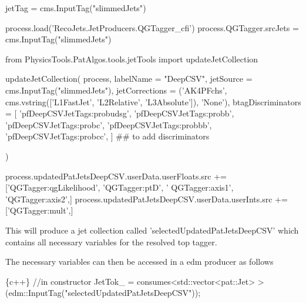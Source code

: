 \begin{DoxyCode}
jetTag = cms.InputTag(\textcolor{stringliteral}{"slimmedJets"})

process.load(\textcolor{stringliteral}{'RecoJets.JetProducers.QGTagger\_cfi'})
process.QGTagger.srcJets   = cms.InputTag(\textcolor{stringliteral}{"slimmedJets"})

from PhysicsTools.PatAlgos.tools.jetTools \textcolor{keyword}{import} updateJetCollection

updateJetCollection(
   process,
   labelName = \textcolor{stringliteral}{"DeepCSV"},
   jetSource = cms.InputTag(\textcolor{stringliteral}{"slimmedJets"}),
   jetCorrections = (\textcolor{stringliteral}{'AK4PFchs'}, cms.vstring([\textcolor{stringliteral}{'L1FastJet'}, \textcolor{stringliteral}{'L2Relative'}, \textcolor{stringliteral}{'L3Absolute'}]), \textcolor{stringliteral}{'None'}),
   btagDiscriminators = [
      \textcolor{stringliteral}{'pfDeepCSVJetTags:probudsg'},
      \textcolor{stringliteral}{'pfDeepCSVJetTags:probb'},
      \textcolor{stringliteral}{'pfDeepCSVJetTags:probc'},
      \textcolor{stringliteral}{'pfDeepCSVJetTags:probbb'},
      \textcolor{stringliteral}{'pfDeepCSVJetTags:probcc'},
      ] ## to add discriminators                                                                           
                                                                                                                  
                             
)

process.updatedPatJetsDeepCSV.userData.userFloats.src += [\textcolor{stringliteral}{'QGTagger:qgLikelihood'}, \textcolor{stringliteral}{'QGTagger:ptD'}, \textcolor{stringliteral}{'
      QGTagger:axis1'}, \textcolor{stringliteral}{'QGTagger:axis2'},]
process.updatedPatJetsDeepCSV.userData.userInts.src += [\textcolor{stringliteral}{'QGTagger:mult'},]
\end{DoxyCode}


This will produce a jet collection called 'selected\-Updated\-Pat\-Jets\-Deep\-C\-S\-V' which contains all necessary variables for the resolved top tagger.

The necessary variables can then be accessed in a edm producer as follows


\begin{DoxyCode}
\{c++\}
\textcolor{comment}{//in constructor}
JetTok\_ = consumes<std::vector<pat::Jet> >(edm::InputTag(\textcolor{stringliteral}{"selectedUpdatedPatJetsDeepCSV"}));
\end{DoxyCode}



